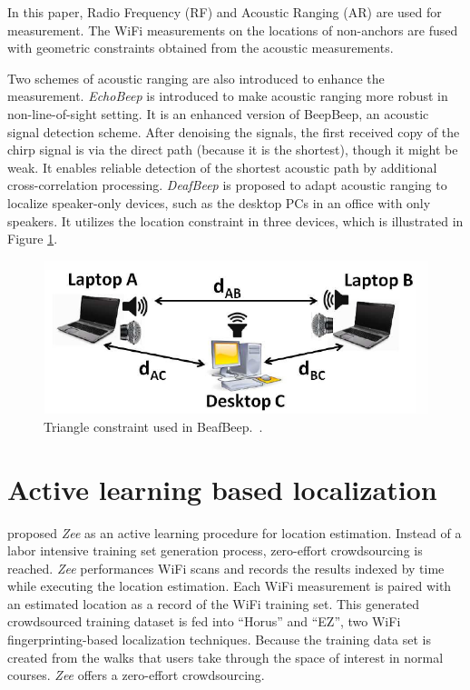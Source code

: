 \documentclass[letterpaper]{article}
\begin{document}
In this paper, Radio Frequency (RF) and Acoustic Ranging (AR) are used for measurement.
The WiFi measurements on the locations of non-anchors are fused with geometric constraints obtained from the acoustic measurements.

Two schemes of acoustic ranging are also introduced to enhance the measurement.
\emph{EchoBeep} is introduced to make acoustic ranging more robust in non-line-of-sight setting.
It is an enhanced version of BeepBeep, an acoustic signal detection scheme.
After denoising the signals, the first received copy of the chirp signal is via the direct path (because it is the shortest), though it might be weak.
It enables reliable detection of the shortest acoustic path by additional cross-correlation processing.
\emph{DeafBeep} is proposed to adapt acoustic ranging to localize speaker-only devices, such as the desktop PCs in an office with only speakers.
It utilizes the location constraint in three devices, which is illustrated in Figure \ref{fig:deafbeep}.
\begin{figure}
	\centering
	\includegraphics[width=0.7\linewidth]{fig/DeafBeep.png}
	\caption{Triangle constraint used in BeafBeep.~\cite{Nandakumar:2012:CLD:2348543.2348579}.}
	\label{fig:deafbeep}
\end{figure}

\section{Active learning based localization}

\cite{Rai:2012:ZZC:2348543.2348580} proposed \emph{Zee} as an active learning procedure for location estimation.
Instead of a labor intensive training set generation process, zero-effort crowdsourcing is reached.
\emph{Zee} performances WiFi scans and records the results indexed by time while executing the location estimation.
Each WiFi measurement is paired with an estimated location as a record of the WiFi training set.
This generated crowdsourced training dataset is fed into ``Horus'' and ``EZ'', two WiFi fingerprinting-based localization techniques.
Because the training data set is created from the walks that users take through the space of interest in normal courses.
\emph{Zee} offers a zero-effort crowdsourcing.
\end{document}
